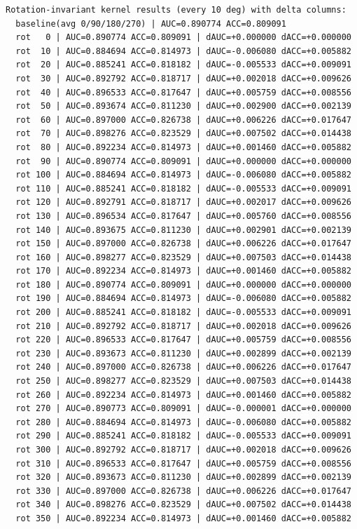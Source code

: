 \documentclass{article}
\begin{document}
\begin{verbatim}
Rotation-invariant kernel results (every 10 deg) with delta columns:
  baseline(avg 0/90/180/270) | AUC=0.890774 ACC=0.809091
  rot   0 | AUC=0.890774 ACC=0.809091 | dAUC=+0.000000 dACC=+0.000000
  rot  10 | AUC=0.884694 ACC=0.814973 | dAUC=-0.006080 dACC=+0.005882
  rot  20 | AUC=0.885241 ACC=0.818182 | dAUC=-0.005533 dACC=+0.009091
  rot  30 | AUC=0.892792 ACC=0.818717 | dAUC=+0.002018 dACC=+0.009626
  rot  40 | AUC=0.896533 ACC=0.817647 | dAUC=+0.005759 dACC=+0.008556
  rot  50 | AUC=0.893674 ACC=0.811230 | dAUC=+0.002900 dACC=+0.002139
  rot  60 | AUC=0.897000 ACC=0.826738 | dAUC=+0.006226 dACC=+0.017647
  rot  70 | AUC=0.898276 ACC=0.823529 | dAUC=+0.007502 dACC=+0.014438
  rot  80 | AUC=0.892234 ACC=0.814973 | dAUC=+0.001460 dACC=+0.005882
  rot  90 | AUC=0.890774 ACC=0.809091 | dAUC=+0.000000 dACC=+0.000000
  rot 100 | AUC=0.884694 ACC=0.814973 | dAUC=-0.006080 dACC=+0.005882
  rot 110 | AUC=0.885241 ACC=0.818182 | dAUC=-0.005533 dACC=+0.009091
  rot 120 | AUC=0.892791 ACC=0.818717 | dAUC=+0.002017 dACC=+0.009626
  rot 130 | AUC=0.896534 ACC=0.817647 | dAUC=+0.005760 dACC=+0.008556
  rot 140 | AUC=0.893675 ACC=0.811230 | dAUC=+0.002901 dACC=+0.002139
  rot 150 | AUC=0.897000 ACC=0.826738 | dAUC=+0.006226 dACC=+0.017647
  rot 160 | AUC=0.898277 ACC=0.823529 | dAUC=+0.007503 dACC=+0.014438
  rot 170 | AUC=0.892234 ACC=0.814973 | dAUC=+0.001460 dACC=+0.005882
  rot 180 | AUC=0.890774 ACC=0.809091 | dAUC=+0.000000 dACC=+0.000000
  rot 190 | AUC=0.884694 ACC=0.814973 | dAUC=-0.006080 dACC=+0.005882
  rot 200 | AUC=0.885241 ACC=0.818182 | dAUC=-0.005533 dACC=+0.009091
  rot 210 | AUC=0.892792 ACC=0.818717 | dAUC=+0.002018 dACC=+0.009626
  rot 220 | AUC=0.896533 ACC=0.817647 | dAUC=+0.005759 dACC=+0.008556
  rot 230 | AUC=0.893673 ACC=0.811230 | dAUC=+0.002899 dACC=+0.002139
  rot 240 | AUC=0.897000 ACC=0.826738 | dAUC=+0.006226 dACC=+0.017647
  rot 250 | AUC=0.898277 ACC=0.823529 | dAUC=+0.007503 dACC=+0.014438
  rot 260 | AUC=0.892234 ACC=0.814973 | dAUC=+0.001460 dACC=+0.005882
  rot 270 | AUC=0.890773 ACC=0.809091 | dAUC=-0.000001 dACC=+0.000000
  rot 280 | AUC=0.884694 ACC=0.814973 | dAUC=-0.006080 dACC=+0.005882
  rot 290 | AUC=0.885241 ACC=0.818182 | dAUC=-0.005533 dACC=+0.009091
  rot 300 | AUC=0.892792 ACC=0.818717 | dAUC=+0.002018 dACC=+0.009626
  rot 310 | AUC=0.896533 ACC=0.817647 | dAUC=+0.005759 dACC=+0.008556
  rot 320 | AUC=0.893673 ACC=0.811230 | dAUC=+0.002899 dACC=+0.002139
  rot 330 | AUC=0.897000 ACC=0.826738 | dAUC=+0.006226 dACC=+0.017647
  rot 340 | AUC=0.898276 ACC=0.823529 | dAUC=+0.007502 dACC=+0.014438
  rot 350 | AUC=0.892234 ACC=0.814973 | dAUC=+0.001460 dACC=+0.005882
\end{verbatim}
\end{document}
